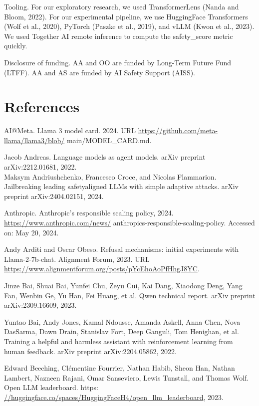 \documentclass[10pt]{article}
\begin{document}
Tooling. For our exploratory research, we used TransformerLens (Nanda and Bloom, 2022). For our experimental pipeline, we use HuggingFace Transformers (Wolf et al., 2020), PyTorch (Paszke et al., 2019), and vLLM (Kwon et al., 2023). We used Together AI remote inference to compute the safety\_score metric quickly.

Disclosure of funding. AA and OO are funded by Long-Term Future Fund (LTFF). AA and AS are funded by AI Safety Support (AISS).

\section*{References}
AI@Meta. Llama 3 model card. 2024. URL \href{https://github.com/meta-llama/llama3/blob/}{https://github.com/meta-llama/llama3/blob/} main/MODEL\_CARD.md.

Jacob Andreas. Language models as agent models. arXiv preprint arXiv:2212.01681, 2022.\\
Maksym Andriushchenko, Francesco Croce, and Nicolas Flammarion. Jailbreaking leading safetyaligned LLMs with simple adaptive attacks. arXiv preprint arXiv:2404.02151, 2024.

Anthropic. Anthropic's responsible scaling policy, 2024. \href{https://www.anthropic.com/news/}{https://www.anthropic.com/news/} anthropics-responsible-scaling-policy. Accessed on: May 20, 2024.

Andy Arditi and Oscar Obeso. Refusal mechanisms: initial experiments with Llama-2-7b-chat. Alignment Forum, 2023. URL \href{https://www.alignmentforum.org/posts/pYcEhoAoPfHhgJ8YC}{https://www.alignmentforum.org/posts/pYcEhoAoPfHhgJ8YC}.

Jinze Bai, Shuai Bai, Yunfei Chu, Zeyu Cui, Kai Dang, Xiaodong Deng, Yang Fan, Wenbin Ge, Yu Han, Fei Huang, et al. Qwen technical report. arXiv preprint arXiv:2309.16609, 2023.

Yuntao Bai, Andy Jones, Kamal Ndousse, Amanda Askell, Anna Chen, Nova DasSarma, Dawn Drain, Stanislav Fort, Deep Ganguli, Tom Henighan, et al. Training a helpful and harmless assistant with reinforcement learning from human feedback. arXiv preprint arXiv:2204.05862, 2022.

Edward Beeching, Clémentine Fourrier, Nathan Habib, Sheon Han, Nathan Lambert, Nazneen Rajani, Omar Sanseviero, Lewis Tunstall, and Thomas Wolf. Open LLM leaderboard. https: \href{//huggingface.co/spaces/HuggingFaceH4/open_llm_leaderboard}{//huggingface.co/spaces/HuggingFaceH4/open\_llm\_leaderboard}, 2023.
\end{document}
